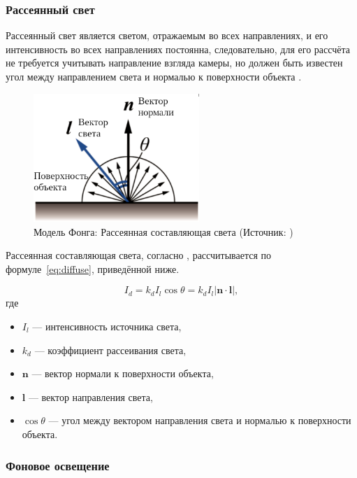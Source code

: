 \subsubsection*{Рассеянный свет}

Рассеянный свет является светом, отражаемым во всех направлениях, и его интенсивность во всех направлениях постоянна, следовательно, для его рассчёта не требуется учитывать направление взгляда камеры, но должен быть известен угол между направлением света и нормалью к поверхности объекта \cite{phong}.

\begin{figure}[H]
	\centering
	\includegraphics[width=0.56\textwidth]{img/diffuse_ru}
    \caption{Модель Фонга: Рассеянная составляющая света (Источник: \cite{phong})}
	\label{fig:diffuse}
\end{figure}

Рассеянная составляющая света, согласно \cite{phong}, рассчитывается по формуле~\ref{eq:diffuse}, приведённой ниже.

\begin{equation}
    I_d = k_d I_l \cos \theta = k_d I_l \left| \boldsymbol{n} \cdot \boldsymbol{l} \right|,
    \label{eq:diffuse}
\end{equation}
где 
\begin{itemize}
    \item $I_l$ --- интенсивность источника света,
    \item $k_d$ --- коэффициент рассеивания света,
    \item $\boldsymbol{n}$ --- вектор нормали к поверхности объекта,
    \item $\boldsymbol{l}$ --- вектор направления света,
    \item $\cos \theta$ --- угол между вектором направления света и нормалью к поверхности объекта.
\end{itemize}

\subsubsection*{Фоновое освещение}

